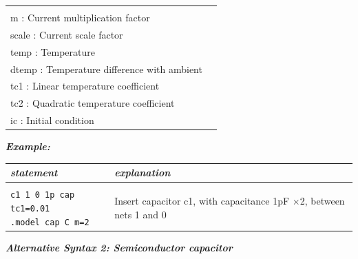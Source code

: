 {\begin{longtable}{l l}
\begin{tabular}{lp{5.5cm}p{5cm}}
																					{\small cap : Capacitance} \\
																					{\small m : Current multiplication factor} \\ 
																					{\small scale : Current scale factor} \\
																					{\small temp :  Temperature} \\
																					{\small dtemp : Temperature difference with ambient} \\
																					{\small tc1 : Linear temperature coefficient} \\
																					{\small tc2 : Quadratic temperature coefficient} \\
																					{\small ic : Initial condition}\end{tabular}																					
\end{longtable}

\textbf{\textit{Example:}}

\begin{longtable}{l l}
\textit{statement} & \textit{explanation} \\ \hline \\ %
			\parbox{15em}{\texttt{c1 1 0 1p cap tc1=0.01}\\ 
			\texttt{.model cap C m=2}}
			& \parbox{25em}{{\small Insert capacitor c1, with capacitance 1pF $\times$2, between\\nets 1 and 0}} 
\end{longtable}


\textbf{\textit{Alternative Syntax 2: Semiconductor capacitor}}


}
